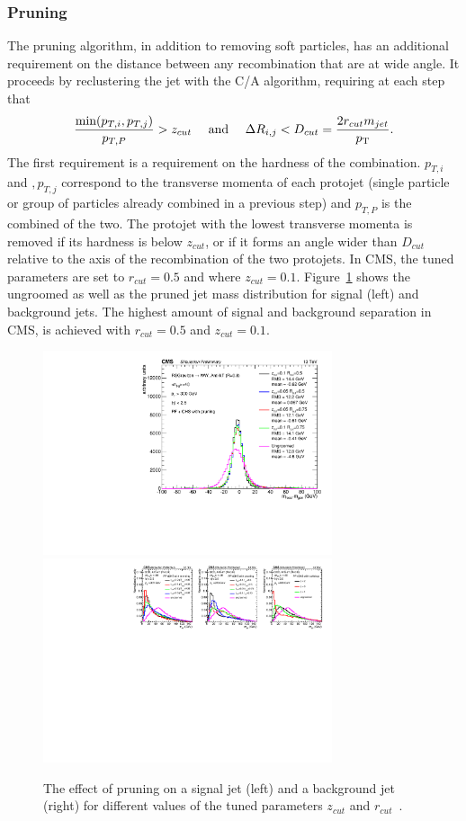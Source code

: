 \subsubsection{Pruning}
\label{sec:objreco:pruning}
The pruning algorithm, in addition to removing soft particles, has an additional requirement on the distance between any recombination that are at wide angle.
It proceeds by reclustering the jet with the C/A algorithm, requiring at each step that
\begin{equation*}
\frac{ \textrm{min}(p_{T,i},p_{T,j}) }{ p_{T,P} } > z_{cut} \quad \textrm{ and } \quad \Delta R_{i,j} < D_{cut} = \frac{2 r_{cut} m_{jet}}{p_{\mathrm{T}}}.
\end{equation*}
The first requirement is a requirement on the hardness of the combination. $p_{T,i}$ and $,p_{T,j}$ correspond to the transverse momenta of each protojet (single particle or group of particles already combined in a previous step) and $p_{T,P}$ is the combined \PT of the two. The protojet with the lowest transverse momenta is removed if its hardness is below $z_{cut}$, or if it forms an angle wider than $D_{cut}$ relative to the axis of the recombination of the two protojets. In CMS, the tuned parameters are set to $r_{cut}=0.5$ and where $z_{cut}=0.1$. Figure~\ref{fig:objreco:pruning} shows the ungroomed as well as the pruned jet mass distribution for signal (left) and background jets. The highest amount of signal and background separation in CMS, is achieved with $r_{cut}=0.5$ and $z_{cut}=0.1$.
\begin{figure}[h] 
    \centering
    \includegraphics[height=6cm]{figures/event_reconstruction/sig_pruning.pdf}
    \includegraphics[height=6cm]{figures/event_reconstruction/bkg_pruning-noData.pdf}
    \caption{The effect of pruning on a signal jet (left) and a background jet (right) for different values of the tuned parameters $z_{cut}$ and $r_{cut}$~\cite{CMS-PAS-JME-14-001}.}
    \label{fig:objreco:pruning}
\end{figure}



